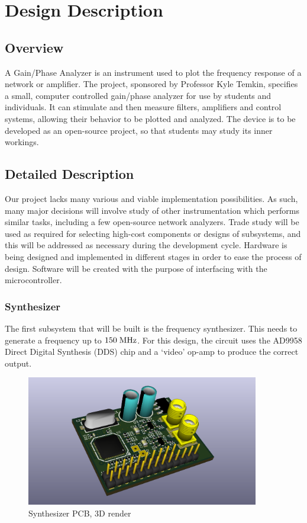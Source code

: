 \chapter{Design Description}

\section{Overview}
A Gain/Phase Analyzer is an instrument used to plot the frequency response of a
network or amplifier. The project, sponsored by Professor Kyle Temkin,
specifies a small, computer controlled gain/phase analyzer for use by students
and individuals. It can stimulate and then measure filters, amplifiers and
control systems, allowing their behavior to be plotted and analyzed. The device
is to be developed as an open-source project, so that students may study its
inner workings.

\section{Detailed Description}
Our project lacks many various and viable implementation
possibilities. As such, many major decisions will involve study of other
instrumentation which performs similar tasks, including a few open-source
network analyzers. Trade study will be used as required for selecting high-cost
components or designs of subsystems, and this will be addressed as necessary
during the development cycle. Hardware is being designed and  implemented in
different stages in order to ease the process of design. Software will be
created with the purpose of interfacing with the microcontroller.

\subsection{Synthesizer}
The first subsystem that will be built is the frequency synthesizer. This needs
to generate a frequency up to $150\;\mathrm{MHz}$. For this design, the circuit uses
the AD9958 Direct Digital Synthesis (DDS) chip and a `video' op-amp to produce
the correct output.

\begin{figure}[H]
\centering
\includegraphics[width=4in]{synth3d.png}
\caption{Synthesizer PCB, 3D render}
\label{fig:synth3d}
\end{figure}

